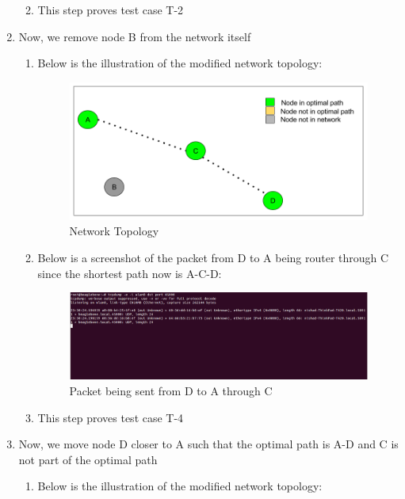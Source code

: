 \documentclass{article}
\begin{document}
\begin{enumerate}
\begin{enumerate}
\begin{figure}[H]
\end{figure}
\item This step proves test case T-2
\end{enumerate}
\item Now, we remove node B from the network itself
\begin{enumerate}
\item Below is the illustration of the modified network topology: %
\begin{figure}[H]
\caption{Network Topology}
\centering
\includegraphics[width=\textwidth]{test_images/graph_4}
\end{figure}
\item Below is a screenshot of the packet from D to A being router through C since the shortest path now is A-C-D: %
\begin{figure}[H]
\caption{Packet being sent from D to A through C}
\centering
\includegraphics[width=\textwidth]{test_images/dump_4}
\end{figure}
\item This step proves test case T-4
\end{enumerate}
\item Now, we move node D closer to A such that the optimal path is A-D and C is not part of the optimal path
\begin{enumerate}
\item Below is the illustration of the modified network topology: %
\begin{figure}[H]

\end{figure}
\end{enumerate}
\end{enumerate}
\end{document}

